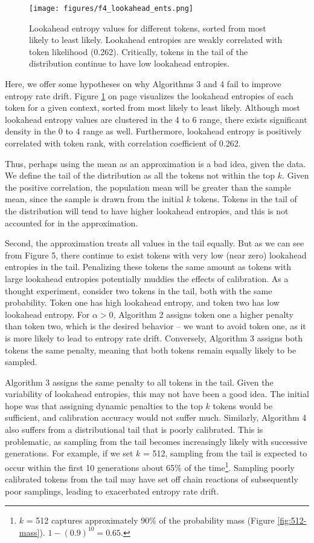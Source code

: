 \documentclass[pageno]{jpaper}
\begin{document}
\begin{figure}
    \centering
    \texttt{[image: figures/f4\_lookahead\_ents.png]}
    \caption{Lookahead entropy values for different tokens, sorted from most likely to least likely. Lookahead entropies are weakly correlated with token likelihood (0.262). Critically, tokens in the tail of the distribution continue to have low lookahead entropies.}
    \label{fig:H-distr}
\end{figure}

Here, we offer some hypotheses on why Algorithms 3 and 4 fail to improve entropy rate drift. Figure \ref{fig:H-distr} on page \pageref{fig:H-distr} visualizes the lookahead entropies of each token for a given context, sorted from most likely to least likely. Although most lookahead entropy values are clustered in the 4 to 6 range, there exists significant density in the 0 to 4 range as well. Furthermore, lookahead entropy is positively correlated with token rank, with correlation coefficient of 0.262.

Thus, perhaps using the mean as an approximation is a bad idea, given the data. We define the tail of the distribution as all the tokens not within the top $k$. Given the positive correlation, the population mean will be greater than the sample mean, since the sample is drawn from the initial $k$ tokens. Tokens in the tail of the distribution will tend to have higher lookahead entropies, and this is not accounted for in the approximation.

Second, the approximation treats all values in the tail equally. But as we can see from Figure 5, there continue to exist tokens with very low (near zero) lookahead entropies in the tail. Penalizing these tokens the same amount as tokens with large lookahead entropies potentially muddies the effects of calibration. As a thought experiment, consider two tokens in the tail, both with the same probability. Token one has high lookahead entropy, and token two has low lookahead entropy. For $\alpha > 0$, Algorithm 2 assigns token one a higher penalty than token two, which is the desired behavior -- we want to avoid token one, as it is more likely to lead to entropy rate drift. Conversely, Algorithm 3 assigns both tokens the same penalty, meaning that both tokens remain equally likely to be sampled.

Algorithm 3 assigns the same penalty to all tokens in the tail. Given the variability of lookahead entropies, this may not have been a good idea. The initial hope was that assigning dynamic penalties to the top $k$ tokens would be sufficient, and calibration accuracy would not suffer much. Similarly, Algorithm 4 also suffers from a distributional tail that is poorly calibrated. This is problematic, as sampling from the tail becomes increasingly likely with successive generations. For example, if we set $k$ = 512, sampling from the tail is expected to occur within the first 10 generations about 65\% of the time\footnote{$k$ = 512 captures approximately 90\% of the probability mass (Figure \ref{fig:512-mass}). $1 - (0.9)^{10} = 0.65.$}. Sampling poorly calibrated tokens from the tail may have set off chain reactions of subsequently poor samplings, leading to exacerbated entropy rate drift.
\end{document}
